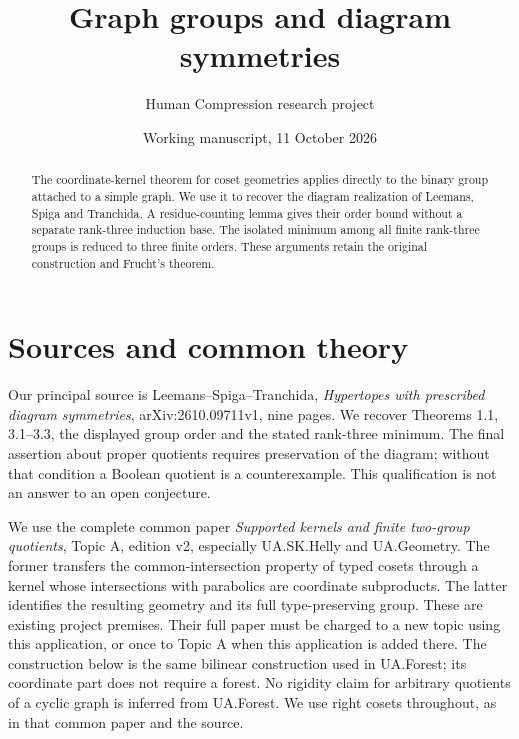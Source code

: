 \documentclass[11pt,a4paper]{article}
\title{Graph groups and diagram symmetries}
\author{Human Compression research project}
\date{Working manuscript, 11 October 2026}
\begin{document}
\maketitle
\begin{abstract}
The coordinate-kernel theorem for coset geometries applies directly to the
binary group attached to a simple graph. We use it to recover the diagram
realization of Leemans, Spiga and Tranchida. A residue-counting lemma gives
their order bound without a separate rank-three induction base. The isolated
minimum among all finite rank-three groups is reduced to three finite orders.
These arguments retain the original construction and Frucht's theorem.
\end{abstract}
\section{Sources and common theory}
Our principal source is Leemans--Spiga--Tranchida, \emph{Hypertopes with
prescribed diagram symmetries}, arXiv:2610.09711v1, nine pages. We recover
Theorems 1.1, 3.1--3.3, the displayed group order and the stated rank-three
minimum. The final assertion about proper quotients requires preservation
of the diagram; without that condition a Boolean quotient is a counterexample.
This qualification is not an answer to an open conjecture.

We use the complete common paper \emph{Supported kernels and finite two-group quotients},
Topic A, edition v2, especially UA.SK.Helly and UA.Geometry. The former
transfers the common-intersection property of typed cosets through a kernel
whose intersections with parabolics are coordinate subproducts. The latter
identifies the resulting geometry and its full type-preserving group. These
are existing project premises. Their full paper must be charged to a new
topic using this application, or once to Topic A when this application is
added there. The construction below is the same bilinear construction used
in UA.Forest; its coordinate part does not require a forest. No rigidity
claim for arbitrary quotients of a cyclic graph is inferred from UA.Forest.
We use right cosets throughout, as in that common paper and the source.
\end{document}
